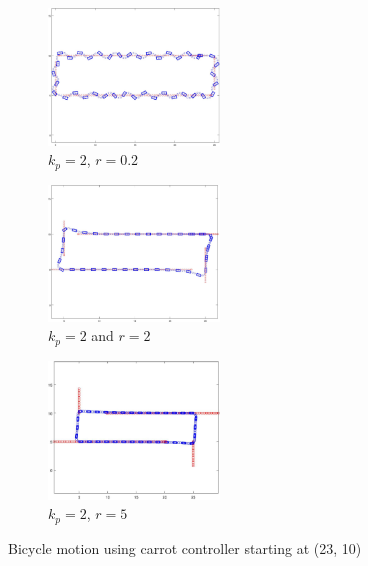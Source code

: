 \documentclass{article}
\begin{document}
\begin{figure}[H]
	\centering
	
	\begin{subfigure}[b]{\linewidth}
		\centering
		\includegraphics[width=0.5\textwidth]{images/bicycle_carrot_bad.jpg}
		\caption{$k_{p} = 2$, $r = 0.2$}
		\label{fig:bicycle_carrot_bad}
	\end{subfigure}
		
	\begin{subfigure}[b]{\linewidth}
		\centering
		\includegraphics[width=0.5\textwidth]{images/bicycle_carrot.jpg}
		\caption{$k_{p} = 2$ and $r = 2$}
		\label{fig:bicycle_carrot_ok}
	\end{subfigure}
	
	\begin{subfigure}[b]{\linewidth}
		\centering
		\includegraphics[width=0.5\textwidth]{images/bicycle_carrot_better.jpg}
		\caption{$k_{p} = 2$, $r = 5$}
		\label{fig:bicycle_carrot_better}
	\end{subfigure}
	
	\caption{Bicycle motion using carrot controller starting at (23, 10)}
	\label{fig:bicycle_carrot}
\end{figure}
\end{document}
